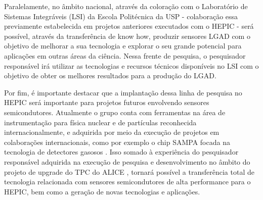 
Paralelamente, no âmbito nacional, através da coloração com o Laboratório de Sistemas Integráveis (LSI) da Escola Politécnica da USP - colaboração essa previamente estabelecida em projetos anteriores executados com o HEPIC \cite{ALICEUP,ref1} - será possível, através da transferência de know how, produzir sensores LGAD com o objetivo de melhorar a sua tecnologia e explorar o seu grande potencial para aplicações em outras áreas da ciência. Nessa frente de pesquisa, o pesquisador responsável irá utilizar as tecnologias e recursos técnicos disponíveis no LSI com o objetivo de obter os melhores resultados para a produção do LGAD.  

Por fim, é importante destacar que a implantação dessa linha de pesquisa no HEPIC será importante para projetos futuros envolvendo sensores semicondutores. Atualmente o grupo conta com ferramentas na área de instrumentação para física nuclear e de partículas reconhecida internacionalmente, e adquirida por meio da execução de projetos em colaborações internacionais, como por exemplo o chip SAMPA focada na tecnologia de detectores gasosos \cite{ref1}. Isso somado à experiência do pesquisador responsável adquirida na execução de pesquisa e desenvolvimento no âmbito do projeto de upgrade do TPC do ALICE \cite{tpcNIM,discharge_paper,GSI_REPO}, tornará possível a transferência total de tecnologia relacionada com sensores semicondutores de alta performance para o HEPIC, bem como a geração de novas tecnologias e aplicações.

\renewcommand{\cleardoublepage}{}
\renewcommand{\clearpage}{}